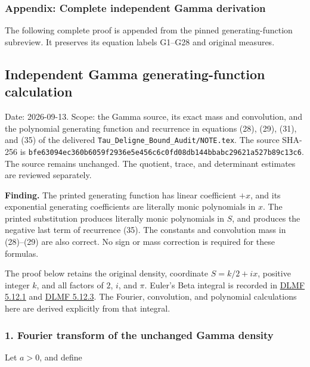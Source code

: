 \documentclass{article}
\begin{document}
\subsubsection{Appendix: Complete independent Gamma derivation}\label{endpoint-gamma_review--appendix-complete-independent-gamma-derivation}

The following complete proof is appended from the pinned generating-function subreview. It preserves its equation labels G1--G28 and original measures.

\subsection{Independent Gamma generating-function calculation}\label{endpoint-gamma_review--independent-gamma-generating-function-calculation}

Date: 2026-09-13. Scope: the Gamma source, its exact mass and convolution, and the polynomial generating function and recurrence in equations (28), (29), (31), and (35) of the delivered \nolinkurl{Tau_Deligne_Bound_Audit/NOTE.tex}. The source SHA-256 is \nolinkurl{bfe63094ec360b6059f2936e5e456c6c0fd08db144bbabc29621a527b89c13c6}. The source remains unchanged. The quotient, trace, and determinant estimates are reviewed separately.

\textbf{Finding.} The printed generating function has linear coefficient \(+x\), and its exponential generating coefficients are literally monic polynomials in \(x\). The printed substitution produces literally monic polynomials in \(S\), and produces the negative last term of recurrence (35). The constants and convolution mass in (28)--(29) are also correct. No sign or mass correction is required for these formulas.

The proof below retains the original density, coordinate \(S=k/2+ix\), positive integer \(k\), and all factors of \(2\), \(i\), and \(\pi\). Euler's Beta integral is recorded in \href{https://dlmf.nist.gov/5.12.E1}{DLMF 5.12.1} and \href{https://dlmf.nist.gov/5.12.E3}{DLMF 5.12.3}. The Fourier, convolution, and polynomial calculations here are derived explicitly from that integral.

\subsubsection{1. Fourier transform of the unchanged Gamma density}\label{endpoint-gamma_review--fourier-transform-of-the-unchanged-gamma-density}

Let \(a>0\), and define
\end{document}

